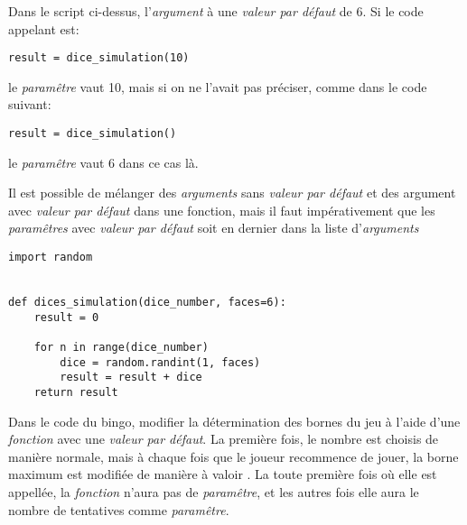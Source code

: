 Dans le script ci-dessus, l'\emph{argument} à une \emph{valeur par défaut} de 6.
Si le code appelant est:
\begin{lstlisting}
result = dice_simulation(10)
\end{lstlisting}

le \emph{paramêtre}  vaut 10, mais si on ne l'avait pas préciser, comme dans le code suivant:

\begin{lstlisting}
result = dice_simulation()
\end{lstlisting}

le \emph{paramêtre}  vaut 6 dans ce cas là.

Il est possible de mélanger des \emph{arguments} sans \emph{valeur par défaut} et des argument avec \emph{valeur par défaut} dans une fonction, mais il faut impérativement que les \emph{paramêtres} avec \emph{valeur par défaut} soit en dernier dans la liste d'\emph{arguments}

\begin{lstlisting}
import random


def dices_simulation(dice_number, faces=6):
	result = 0
	
	for n in range(dice_number)
		dice = random.randint(1, faces)
		result = result + dice
	return result
\end{lstlisting}
Dans le code du bingo, modifier la détermination des bornes du jeu à l'aide d'une \emph{fonction} avec une \emph{valeur par défaut}.
La première fois, le nombre est choisis de manière normale, mais à chaque fois que le joueur recommence de jouer, la borne maximum est modifiée de manière à valoir .
La toute première fois où elle est appellée, la \emph{fonction} n'aura pas de \emph{paramêtre}, et les autres fois elle aura le nombre de tentatives comme \emph{paramêtre}. 